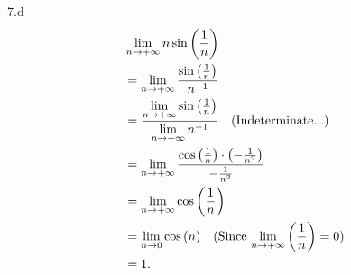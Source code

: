 \documentclass{report}
\begin{document}
    \pagebreak \bigbreak \noindent 
    7.d
    \begin{align*}
        &\lim\limits_{n \to +\infty}{n\sin{\left(\frac{1}{n}\right)}} \\
        &=\lim\limits_{n \to +\infty}{\frac{\sin{\left(\frac{1}{n}\right)}}{n^{-1}}} \\
        &=\frac{\lim\limits_{n \to +\infty}{\sin{\left(\frac{1}{n}\right)}}}{\lim\limits_{n \to +\infty}{n^{-1}}} \quad \text{(Indeterminate...)}\\
        &=\lim\limits_{n \to +\infty}{\frac{\cos{\left(\frac{1}{n}\right)\cdot\left(-\frac{1}{n^{2}}\right)}}{-\frac{1}{n^{2}}}} \\
        &= \lim\limits_{n \to +\infty}{\cos{\left(\frac{1}{n}\right)}} \\
        &= \lim\limits_{n \to 0}{\cos{(n)}} \quad \text{(Since $ \lim\limits_{n \to +\infty}{\left(\frac{1}{n}\right)} = 0$)} \\
        &= 1
    .\end{align*}
\end{document}
